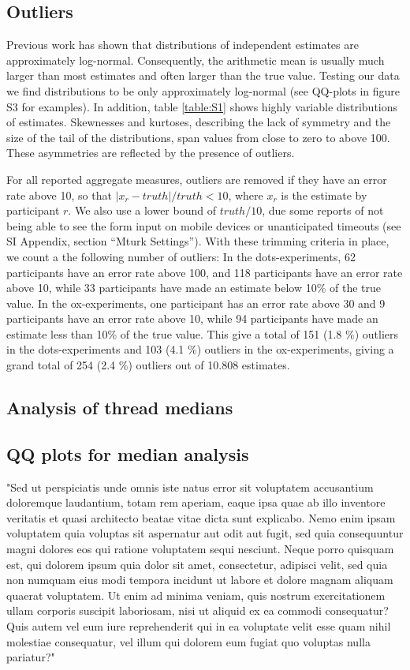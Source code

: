 \documentclass[9pt,twoside,lineno]{pnas-new}
\begin{document}
\subsection*{Outliers}
Previous work has shown that distributions of independent estimates are approximately log-normal. Consequently, the arithmetic mean is usually much larger than most estimates and often larger than the true value. Testing our data we find distributions to be only approximately log-normal (see QQ-plots in figure S3 for examples). In addition, table \ref{table:S1} shows highly variable distributions of estimates. Skewnesses and kurtoses, describing the lack of symmetry and the size of the tail of the distributions, span values from close to zero to above 100. These asymmetries are reflected by the presence of outliers. 

For all reported aggregate measures, outliers are removed if they have an error rate above 10, so that $|x_r-truth|/truth <10$, where $x_r$ is the estimate by participant $r$. We also use a lower bound of $truth/10$, due some reports of not being able to see the form input on mobile devices or unanticipated timeouts (see SI Appendix, section “Mturk Settings”). With these trimming criteria in place, we count a the following number of outliers: In the dots-experiments, 62 participants have an error rate above 100, and 118 participants have an error rate above 10, while 33 participants have made an estimate below 10\% of the true value. In the ox-experiments, one participant has an error rate above 30 and 9 participants have an error rate above 10, while 94 participants have made an estimate less than 10\% of the true value. This give a total of 151 (1.8 \%) outliers in the dots-experiments and 103 (4.1 \%) outliers in the ox-experiments, giving a grand total of 254 (2.4 \%) outliers out of 10.808 estimates.



\subsection*{Analysis of thread medians}
\subsection*{QQ plots for median analysis}
"Sed ut perspiciatis unde omnis iste natus error sit voluptatem accusantium doloremque laudantium, totam rem aperiam, eaque ipsa quae ab illo inventore veritatis et quasi architecto beatae vitae dicta sunt explicabo. Nemo enim ipsam voluptatem quia voluptas sit aspernatur aut odit aut fugit, sed quia consequuntur magni dolores eos qui ratione voluptatem sequi nesciunt. Neque porro quisquam est, qui dolorem ipsum quia dolor sit amet, consectetur, adipisci velit, sed quia non numquam eius modi tempora incidunt ut labore et dolore magnam aliquam quaerat voluptatem. Ut enim ad minima veniam, quis nostrum exercitationem ullam corporis suscipit laboriosam, nisi ut aliquid ex ea commodi consequatur? Quis autem vel eum iure reprehenderit qui in ea voluptate velit esse quam nihil molestiae consequatur, vel illum qui dolorem eum fugiat quo voluptas nulla pariatur?"
\end{document}
